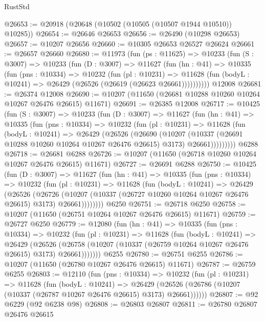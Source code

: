 \begin{lexlean}{RustStd}
\begin{coremodule}
@26653 := @20918 (@20648 (@10502 (@10505 (@10507 @1944 @10510)) @10285))
@26654 := @26646 @26653
@26656 := @26490 (@10298 @26653)
@26657 := @10207 @26656
@26660 := @10305 @26653 @26527 @26624
@26661 := @26657 @26660
@26680 := @11973
    (fun (ps : @11625) =>
    @10233
      (fun (S : @3007) =>
      @10233
        (fun (D : @3007) =>
        @11627
          (fun (hn : @41) =>
          @10335
            (fun (pns : @10334) =>
            @10232
              (fun (pl : @10231) =>
              @11628 (fun (bodyL : @10241) => @26429 (@26526 (@26619 (@26623 @26661))))))))))
    @12008
@26681 := @26374 @12008
@26690 := @10207 (@11650 (@26681 @10288 @10260 @10264 @10267 @26476 @26615) @11671)
@26691 := @26385 @12008
@26717 := @10425
    (fun (S : @3007) =>
    @10233
      (fun (D : @3007) =>
      @11627
        (fun (hn : @41) =>
        @10335
          (fun (pns : @10334) =>
          @10232
            (fun (pl : @10231) =>
            @11628
              (fun (bodyL : @10241) =>
              @26429
                (@26526
                  (@26690
                    (@10207
                      (@10337 (@26691 @10288 @10260 @10264 @10267 @26476 @26615) @3173)
                      @26661)))))))))
    @6288
@26718 := @26681 @6288
@26726 := @10207 (@11650 (@26718 @10260 @10264 @10267 @26476 @26615) @11671)
@26727 := @26691 @6288
@26750 := @10425
    (fun (D : @3007) =>
    @11627
      (fun (hn : @41) =>
      @10335
        (fun (pns : @10334) =>
        @10232
          (fun (pl : @10231) =>
          @11628
            (fun (bodyL : @10241) =>
            @26429
              (@26526
                (@26726
                  (@10207 (@10337 (@26727 @10260 @10264 @10267 @26476 @26615) @3173) @26661))))))))
    @6250
@26751 := @26718 @6250
@26758 := @10207 (@11650 (@26751 @10264 @10267 @26476 @26615) @11671)
@26759 := @26727 @6250
@26779 := @12080
    (fun (hn : @41) =>
    @10335
      (fun (pns : @10334) =>
      @10232
        (fun (pl : @10231) =>
        @11628
          (fun (bodyL : @10241) =>
          @26429
            (@26526
              (@26758 (@10207 (@10337 (@26759 @10264 @10267 @26476 @26615) @3173) @26661)))))))
    @6255
@26780 := @26751 @6255
@26786 := @10207 (@11650 (@26780 @10267 @26476 @26615) @11671)
@26787 := @26759 @6255
@26803 := @12110
    (fun (pns : @10334) =>
    @10232
      (fun (pl : @10231) =>
      @11628
        (fun (bodyL : @10241) =>
        @26429 (@26526 (@26786 (@10207 (@10337 (@26787 @10267 @26476 @26615) @3173) @26661))))))
@26807 := @92 @6229 (@92 @6238 @98)
@26808 := @26803 @26807
@26811 := @26780 @26807 @26476 @26615

\end{coremodule}
\end{lexlean}

